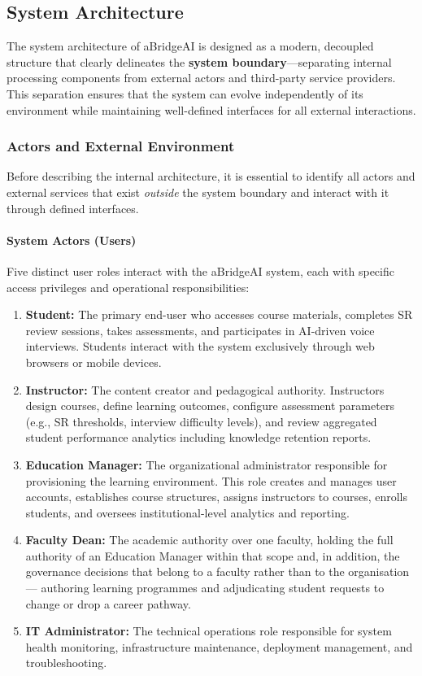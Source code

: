 \subsection{System Architecture}

The system architecture of aBridgeAI is designed as a modern, decoupled structure that clearly delineates the \textbf{system boundary}---separating internal processing components from external actors and third-party service providers. This separation ensures that the system can evolve independently of its environment while maintaining well-defined interfaces for all external interactions.

\subsubsection{Actors and External Environment}
Before describing the internal architecture, it is essential to identify all actors and external services that exist \textit{outside} the system boundary and interact with it through defined interfaces.

\paragraph{System Actors (Users)}
Five distinct user roles interact with the aBridgeAI system, each with specific access privileges and operational responsibilities:

\begin{enumerate}
    \item \textbf{Student:} The primary end-user who accesses course materials, completes SR review sessions, takes assessments, and participates in AI-driven voice interviews. Students interact with the system exclusively through web browsers or mobile devices.
    \item \textbf{Instructor:} The content creator and pedagogical authority. Instructors design courses, define learning outcomes, configure assessment parameters (e.g., SR thresholds, interview difficulty levels), and review aggregated student performance analytics including knowledge retention reports.
    \item \textbf{Education Manager:} The organizational administrator responsible for provisioning the learning environment. This role creates and manages user accounts, establishes course structures, assigns instructors to courses, enrolls students, and oversees institutional-level analytics and reporting.
    \item \textbf{Faculty Dean:} The academic authority over one faculty, holding the full authority of an Education Manager within that scope and, in addition, the governance decisions that belong to a faculty rather than to the organisation --- authoring learning programmes and adjudicating student requests to change or drop a career pathway.
    \item \textbf{IT Administrator:} The technical operations role responsible for system health monitoring, infrastructure maintenance, deployment management, and troubleshooting.
\end{enumerate}

